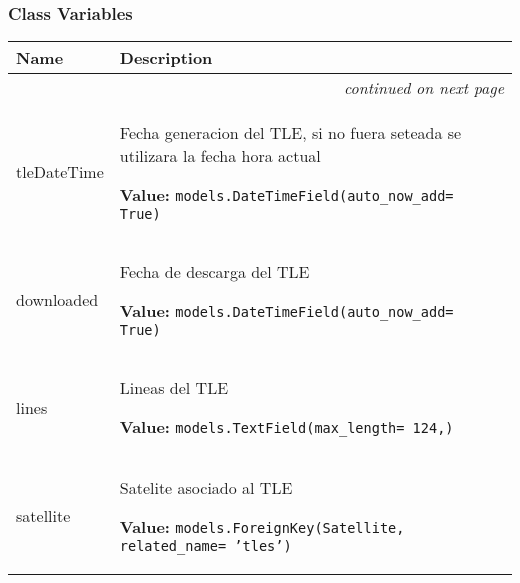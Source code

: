 
  \subsubsection{Class Variables}

    \vspace{-1cm}
\hspace{\varindent}\begin{longtable}{|p{\varnamewidth}|p{\vardescrwidth}|l}
\cline{1-2}
\cline{1-2} \centering \textbf{Name} & \centering \textbf{Description}& \\
\cline{1-2}
\endhead\cline{1-2}\multicolumn{3}{r}{\small\textit{continued on next page}}\\\endfoot\cline{1-2}
\endlastfoot\raggedright t\-l\-e\-D\-a\-t\-e\-T\-i\-m\-e\- & \raggedright Fecha generacion del TLE, si no fuera seteada se utilizara la 
          fecha hora actual

\textbf{Value:} 
{\tt models.DateTimeField(auto\_now\_add= True)}&\\
\cline{1-2}
\raggedright d\-o\-w\-n\-l\-o\-a\-d\-e\-d\- & \raggedright Fecha de descarga del TLE

\textbf{Value:} 
{\tt models.DateTimeField(auto\_now\_add= True)}&\\
\cline{1-2}
\raggedright l\-i\-n\-e\-s\- & \raggedright Lineas del TLE

\textbf{Value:} 
{\tt models.TextField(max\_length= 124,)}&\\
\cline{1-2}
\raggedright s\-a\-t\-e\-l\-l\-i\-t\-e\- & \raggedright Satelite asociado al TLE

\textbf{Value:} 
{\tt models.ForeignKey(Satellite, related\_name= 'tles')}&\\
\cline{1-2}
\end{longtable}

